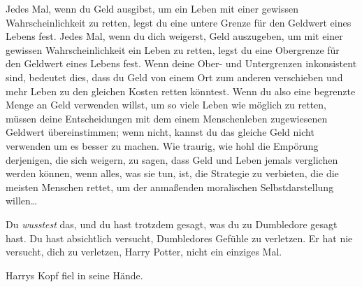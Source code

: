 \begin{em}
Jedes Mal, wenn du Geld ausgibst, um ein Leben mit einer gewissen Wahrscheinlichkeit zu retten, legst du eine untere Grenze für den Geldwert eines Lebens fest. Jedes Mal, wenn du dich weigerst, Geld auszugeben, um mit einer gewissen Wahrscheinlichkeit ein Leben zu retten, legst du eine Obergrenze für den Geldwert eines Lebens fest. Wenn deine Ober- und Untergrenzen inkonsistent sind, bedeutet dies, dass du Geld von einem Ort zum anderen verschieben und mehr Leben zu den gleichen Kosten retten könntest. Wenn du also eine begrenzte Menge an Geld verwenden willst, um so viele Leben wie möglich zu retten, müssen deine Entscheidungen mit dem einem Menschenleben zugewiesenen Geldwert übereinstimmen; wenn nicht, kannst du das gleiche Geld nicht verwenden um es besser zu machen. Wie traurig, wie hohl die Empörung derjenigen, die sich weigern, zu sagen, dass Geld und Leben jemals verglichen werden können, wenn alles, was sie tun, ist, die Strategie zu verbieten, die die meisten Menschen rettet, um der anmaßenden moralischen Selbstdarstellung willen…



Du \emph{wusstest} das, und du hast trotzdem gesagt, was du zu Dumbledore gesagt hast. Du hast absichtlich versucht, Dumbledores Gefühle zu verletzen. Er hat nie versucht, dich zu verletzen, Harry Potter, nicht ein einziges Mal.
\end{em}
Harrys Kopf fiel in seine Hände.

